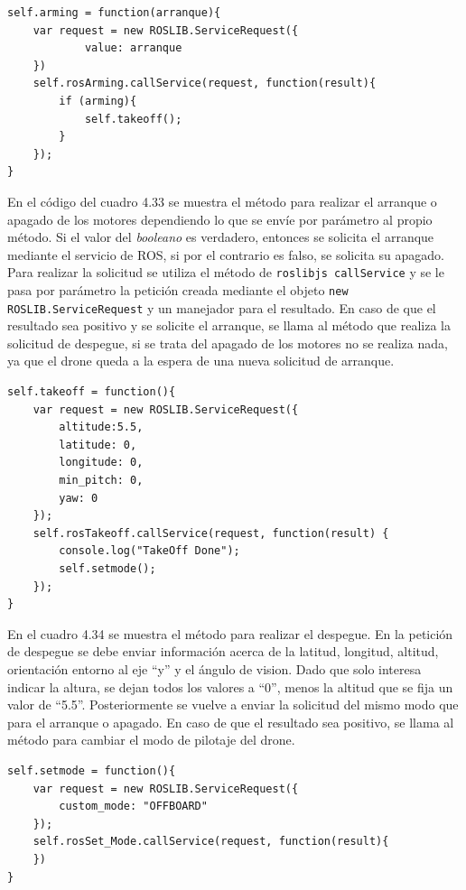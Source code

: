 \begin{lstlisting}[caption= Método para arrancar o apagar los motores del drone, label=cod.arming]
self.arming = function(arranque){
	var request = new ROSLIB.ServiceRequest({
			value: arranque
	})
	self.rosArming.callService(request, function(result){
		if (arming){
			self.takeoff();
		} 
	});
}
\end{lstlisting}

En el código del cuadro 4.33 se muestra el método para realizar el arranque o apagado de los motores dependiendo lo que se envíe por parámetro al propio método. Si el valor del \textit{booleano} es verdadero, entonces se solicita el arranque mediante el servicio de ROS, si por el contrario es falso, se solicita su apagado. Para realizar la solicitud se utiliza el método de \texttt{roslibjs callService} y se le pasa por parámetro la petición creada mediante el objeto \texttt{new ROSLIB.ServiceRequest} y un manejador para el resultado. En caso de que el resultado sea positivo y se solicite el arranque, se llama al método que realiza la solicitud de despegue, si se trata del apagado de los motores no se realiza nada, ya que el drone queda a la espera de una nueva solicitud de arranque.

\begin{lstlisting}[caption= Método para arrancar o apagar los motores del drone, label=cod.takeoff]
self.takeoff = function(){
	var request = new ROSLIB.ServiceRequest({
		altitude:5.5,
		latitude: 0,
		longitude: 0,
		min_pitch: 0,
		yaw: 0
	});
	self.rosTakeoff.callService(request, function(result) {
		console.log("TakeOff Done");
		self.setmode();
	});
}
\end{lstlisting}

En el cuadro 4.34 se muestra el método para realizar el despegue. En la petición de despegue se debe enviar información acerca de la latitud, longitud, altitud, orientación entorno al eje ``y'' y el ángulo de vision. Dado que solo interesa indicar la altura, se dejan todos los valores a ``0'', menos la altitud que se fija un valor de ``5.5''. Posteriormente se vuelve a enviar la solicitud del mismo modo que para el arranque o apagado. En caso de que el resultado sea positivo, se llama al método para cambiar el modo de pilotaje del drone.

\begin{lstlisting}[caption= Método para cambiar el modo de pilotaje, label=cod.setMode]
self.setmode = function(){
	var request = new ROSLIB.ServiceRequest({
		custom_mode: "OFFBOARD"
	});
	self.rosSet_Mode.callService(request, function(result){
	})
}
\end{lstlisting}

